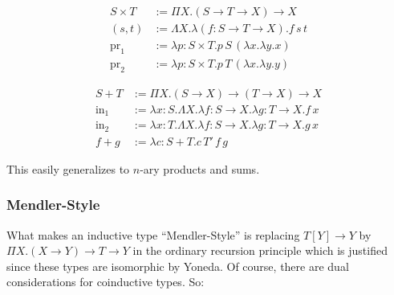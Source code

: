 \begin{minipage}{0.45\textwidth}
  \begin{align*}
    S \times T
    &:= \Pi X. (S \to T \to X) \to X
    \\
    (s,t)
    &:= \Lambda X. \lambda (f : S \to T \to X). f \, s \, t
    \\
    \text{pr}_{1}
    &:= \lambda p : S \times T. p \, S \, (\lambda x. \lambda y. x)
    \\
    \text{pr}_{2}
    &:= \lambda p : S \times T. p \, T \, (\lambda x. \lambda y. y)
  \end{align*}
\end{minipage}
\begin{minipage}{0.45\textwidth}
  \begin{align*}
    S + T
    &:= \Pi X. (S \to X) \to (T \to X) \to X
    \\
    \text{in}_{1}
    &:= \lambda x : S. \Lambda X. \lambda f : S \to X. \lambda g :T \to X. f \, x
    \\
    \text{in}_{2}
    &:= \lambda x : T. \Lambda X. \lambda f : S \to X. \lambda g :T \to X. g \, x
    \\
    f + g
    &:= \lambda c : S + T. c \, T' \, f \, g
  \end{align*}
\end{minipage}

\vspace*{0.3cm}
This easily generalizes to $n$-ary products and sums.

\subsubsection{Mendler-Style}

\vspace*{0.3cm}
What makes an inductive type \enquote{Mendler-Style} is replacing $T[Y] \to Y$ by $\Pi X.(X \to Y) \to T \to Y$ in the ordinary recursion principle which is justified since these types are isomorphic by Yoneda.
Of course, there are dual considerations for coinductive types.
So:

\vspace*{0.3cm}
\begin{prooftree}
\end{prooftree}

\vspace*{0.3cm}
\begin{prooftree}
\end{prooftree}

